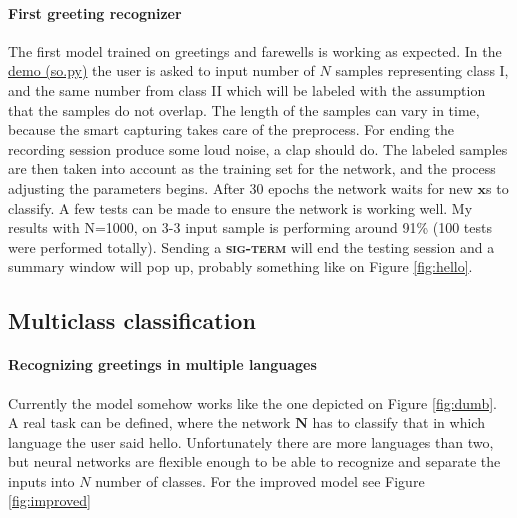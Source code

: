 \paragraph{First greeting recognizer}
The first model trained on greetings and farewells is working as expected. In the \href{https://github.com/botcs/deepvision/tree/master/demo/audio}{demo (so.py)} the user is asked to input number of $N$ samples representing class I, and the same number from class II which will be labeled with the assumption that the samples do not overlap. The length of the samples can vary in time, because the smart capturing takes care of the preprocess. For ending the recording session produce some loud noise, a clap should do. The labeled samples are then taken into account as the training set for the network, and the process adjusting the parameters begins. After 30 epochs the network waits for new $\mathbf{x}$s to classify. A few tests can be made to ensure the network is working well. My results with N=1000, on 3-3 input sample is performing around 91\% (100 tests were performed totally). Sending a \textbf{\textsc{sig-term}} will end the testing session and a summary window will pop up, probably something like on Figure \ref{fig:hello}.



\subsection{Multiclass classification}
\paragraph{Recognizing greetings in multiple languages}
Currently the model somehow works like the one depicted on Figure \ref{fig:dumb}. A real task can be defined, where the network $\mathbf{N}$ has to classify that in which language the user said hello. Unfortunately there are more languages than two, but neural networks are flexible enough to be able to recognize and separate the inputs into  $N$ number of classes. For the improved model see Figure \ref{fig:improved} \\

